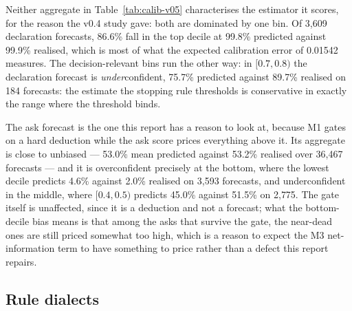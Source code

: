 \documentclass[11pt]{article}
\theoremstyle{definition}
\providecommand{\numCalibAskLowN}{3{,}593}
\providecommand{\numCalibAskLowObs}{2.0}
\providecommand{\numCalibAskLowPred}{4.6}
\providecommand{\numCalibAskMidN}{2{,}775}
\providecommand{\numCalibAskMidObs}{51.5}
\providecommand{\numCalibAskMidPred}{45.0}
\providecommand{\numCalibAskN}{36{,}467}
\providecommand{\numCalibAskObs}{53.2}
\providecommand{\numCalibAskPred}{53.0}
\providecommand{\numCalibDeclECE}{0.01542}
\providecommand{\numCalibDeclMidN}{184}
\providecommand{\numCalibDeclMidObs}{89.7}
\providecommand{\numCalibDeclMidPred}{75.7}
\providecommand{\numCalibDeclN}{3{,}609}
\providecommand{\numCalibDeclTopObs}{99.9}
\providecommand{\numCalibDeclTopPred}{99.8}
\providecommand{\numCalibDeclTopShare}{86.6}
\begin{document}
Neither aggregate in Table~\ref{tab:calib-v05} characterises the estimator it
scores, for the reason the v0.4 study gave: both are dominated by one bin. Of
\numCalibDeclN{} declaration forecasts, \numCalibDeclTopShare\% fall in the top
decile at \numCalibDeclTopPred\% predicted against \numCalibDeclTopObs\%
realised, which is most of what the expected calibration error of
\numCalibDeclECE{} measures. The decision-relevant bins run the other way: in
$[0.7, 0.8)$ the declaration forecast is \emph{under}confident,
\numCalibDeclMidPred\% predicted against \numCalibDeclMidObs\% realised on
\numCalibDeclMidN{} forecasts: the estimate the stopping rule thresholds is
conservative in exactly the range where the threshold binds.

The ask forecast is the one this report has a reason to look at, because M1
gates on a hard deduction while the ask score prices everything above it. Its
aggregate is close to unbiased --- \numCalibAskPred\% mean predicted against
\numCalibAskObs\% realised over \numCalibAskN{} forecasts --- and it is
overconfident precisely at the bottom, where the lowest decile predicts
\numCalibAskLowPred\% against \numCalibAskLowObs\% realised on
\numCalibAskLowN{} forecasts, and underconfident in the middle, where $[0.4, 0.5)$
predicts \numCalibAskMidPred\% against \numCalibAskMidObs\% on
\numCalibAskMidN{}. The gate itself is unaffected, since it is a deduction and
not a forecast; what the bottom-decile bias means is that among the asks that
survive the gate, the near-dead ones are still priced somewhat too high, which is
a reason to expect the M3 net-information term to have something to price rather
than a defect this report repairs.

\subsection{Rule dialects}
\label{sec:results-dialects}
\end{document}
